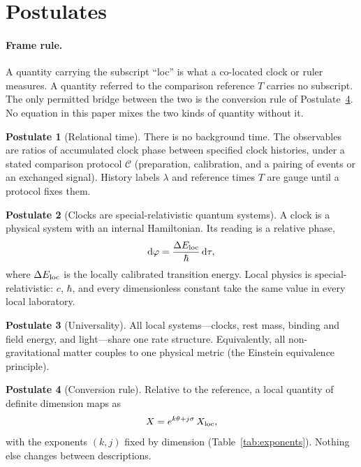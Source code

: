 \documentclass[11pt]{article}
\newcommand{\thP}{\theta}             %
\newcommand{\sgP}{\sigma}             %
\newcommand{\cph}{\varphi}            %
\newcommand{\Eloc}{E_{\rm loc}}       %
\newcommand{\dd}{\mathrm{d}}
\newcommand{\Tref}{T}                 %
\theoremstyle{plain}
\theoremstyle{definition}
\newtheorem{postulate}{Postulate}
\theoremstyle{remark}
\begin{document}
\section{Postulates}
\label{sec:postulates}

\paragraph{Frame rule.} A quantity carrying the subscript ``loc'' is what a co-located clock or ruler measures. A quantity referred to the comparison reference $\Tref$ carries no subscript. The only permitted bridge between the two is the conversion rule of Postulate~\ref{P:conv}. No equation in this paper mixes the two kinds of quantity without it.

\begin{postulate}[Relational time]\label{P:rel}
There is no background time. The observables are ratios of accumulated clock phase between specified clock histories, under a stated comparison protocol $\mathcal C$ (preparation, calibration, and a pairing of events or an exchanged signal). History labels $\lambda$ and reference times $\Tref$ are gauge until a protocol fixes them.
\end{postulate}

\begin{postulate}[Clocks are special-relativistic quantum systems]\label{P:SR}
A clock is a physical system with an internal Hamiltonian. Its reading is a relative phase,
\begin{equation}
\dd\cph = \frac{\Delta\Eloc}{\hbar}\,\dd\tau ,
\label{eq:clockphase}
\end{equation}
where $\Delta\Eloc$ is the locally calibrated transition energy. Local physics is special-relativistic: $c$, $\hbar$, and every dimensionless constant take the same value in every local laboratory.
\end{postulate}

\begin{postulate}[Universality]\label{P:univ}
All local systems---clocks, rest mass, binding and field energy, and light---share one rate structure. Equivalently, all non-gravitational matter couples to one physical metric (the Einstein equivalence principle).
\end{postulate}

\begin{postulate}[Conversion rule]\label{P:conv}
Relative to the reference, a local quantity of definite dimension maps as
\begin{equation}
X = e^{k\thP + j\sgP}\,X_{\rm loc},
\label{eq:conversion}
\end{equation}
with the exponents $(k,j)$ fixed by dimension (Table~\ref{tab:exponents}). Nothing else changes between descriptions.
\end{postulate}
\end{document}
